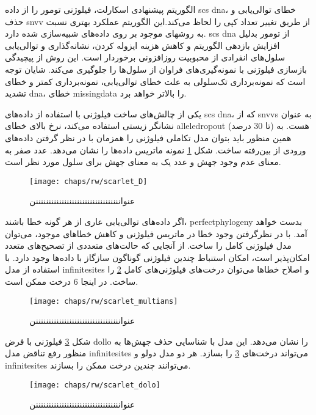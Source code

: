 الگوریتم پیشنهادی اسکارلت، فیلوژنی تومور را از داده \gls{scs} \gls{dna}، خطای توالی‌یابی و حذف \gls{snvv} از طریق تغییر تعداد کپی را لحاظ می‌کند.این الگوریتم عملکرد بهتری نسبت به روشهای موجود بر روی داده‌های شبیه‌سازی شده دارد. \gls{scs} \gls{dna} از تومور بدلیل افزایش بازدهی الگوریتم و کاهش هزینه ایزوله کردن، نشانه‌گذاری و توالی‌یابی سلول‌های انفرادی از محبوبیت روزافزونی برخوردار است. این روش از پیچیدگی بازسازی فیلوژنی با نمونه‌گیری‌های فراوان از سلول‌ها را جلوگیری می‌کند. شایان توجه است که نمونه‌برداری تک‌سلولی به علت خطای توالی‌یابی، نمونه‌برداری کمتر و خطای تشدید \gls{dna}، خطای \gls{missingdata} را بالاتر خواهد برد. 

یکی از چالش‌های ساخت فیلوژنی با استفاده از داده‌های \gls{scs} \gls{dna}، که از \glspl{snvv} به عنوان نشانگر زیستی استفاده می‌کند، نرخ بالای خطای  \gls{alleledropout} (تا 30 درصد) هست. به همین منظور باید بتوان مدل تکاملی فیلوژنی را همزمان با در نظر گرفتن داده‌های ورودی از بین‌رفته ساخت. شکل \ref{fig:ch_rw:scarlet_D} نمونه ماتریس داده‌ها را نشان می‌دهد. عدد صفر به معنای عدم وجود جهش و عدد یک به معنای جهش برای سلول مورد نظر است.

\begin{figure}[!ht]
	\centerline{\texttt{[image: chaps/rw/scarlet\_D]}}
	\caption{عنوانننننننننننننننننننننننننننننننننن}
	\label{fig:ch_rw:scarlet_D}
\end{figure}


اگر داده‌های توالی‌یابی عاری از هر گونه خطا باشند، \gls{perfectphylogeny} بدست خواهد آمد. با در نظرگرفتن وجود خطا در ماتریس فیلوژنی و کاهش خطاهای موجود، می‌توان مدل فیلوژنی کامل را ساخت. از آنجایی که حالت‌های متعددی از تصحیح‌های متعدد امکان‌پذیر است، امکان استنباط چندین فیلوژنی گوناگون سازگاز با داده‌ها وجود دارد. با استفاده از مدل \gls{infinitesites} و اصلاح خطاها می‌توان درخت‌های فیلوژنی‌های کامل \ref{fig:ch_rw:scarlet_multians} را ساخت. در اینجا 6 درخت ممکن است.


\begin{figure}[!ht]
	\centerline{\texttt{[image: chaps/rw/scarlet\_multians]}}
	\caption{عنوانننننننننننننننننننننننننننننننننن}
	\label{fig:ch_rw:scarlet_multians}
\end{figure}

شکل \ref{fig:ch_rw:scarlet_dolo} فیلوژنی با فرض \gls{dollo} را نشان می‌دهد. این مدل با شناسایی حذف جهش‌ها به منظور رفع تناقض مدل  \gls{infinitesites} می‌تواند درخت‌های \ref{fig:ch_rw:scarlet_dolo} را بسازد. هر دو مدل دولو و \gls{infinitesites} می‌توانند چندین درخت ممکن را بسازند. 


\begin{figure}[!ht]
	\centerline{\texttt{[image: chaps/rw/scarlet\_dolo]}}
	\caption{عنوانننننننننننننننننننننننننننننننننن}
	\label{fig:ch_rw:scarlet_dolo}
\end{figure}

